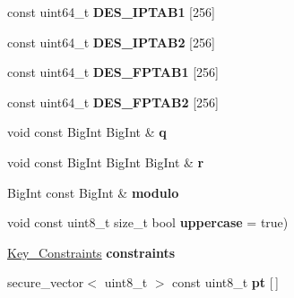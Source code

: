 \begin{DoxyCompactItemize}
\item 
\mbox{\label{namespace_botan_ad7e89955b908b23a9f94ba933c449349}} 
const uint64\+\_\+t {\bfseries D\+E\+S\+\_\+\+I\+P\+T\+A\+B1} \mbox{[}256\mbox{]}
\item 
\mbox{\label{namespace_botan_a81eb07a1d69c9086ecbb45da467022d5}} 
const uint64\+\_\+t {\bfseries D\+E\+S\+\_\+\+I\+P\+T\+A\+B2} \mbox{[}256\mbox{]}
\item 
\mbox{\label{namespace_botan_aa5c5bba8c5275bebff0ff78771712a6d}} 
const uint64\+\_\+t {\bfseries D\+E\+S\+\_\+\+F\+P\+T\+A\+B1} \mbox{[}256\mbox{]}
\item 
\mbox{\label{namespace_botan_ad1e53869fb08b0b36a6ce75fc84cafff}} 
const uint64\+\_\+t {\bfseries D\+E\+S\+\_\+\+F\+P\+T\+A\+B2} \mbox{[}256\mbox{]}
\item 
\mbox{\label{namespace_botan_affe4f8a154009de5159500f03f51432c}} 
void const Big\+Int Big\+Int \& {\bfseries q}
\item 
\mbox{\label{namespace_botan_a9ddeb484029696af800c95d07e76eac4}} 
void const Big\+Int Big\+Int Big\+Int \& {\bfseries r}
\item 
\mbox{\label{namespace_botan_a3ca67d3e67f9e197824bd761c4748d17}} 
Big\+Int const Big\+Int \& {\bfseries modulo}
\item 
\mbox{\label{namespace_botan_a42a3f342c74ac8f571459d0ca7056806}} 
void const uint8\+\_\+t size\+\_\+t bool {\bfseries uppercase} = true)
\item 
\mbox{\label{namespace_botan_a705f886fe973cef51f3867fddbeb05e7}} 
\hyperlink{namespace_botan_aed0885e5c70627dd43827b966e727654}{Key\+\_\+\+Constraints} {\bfseries constraints}
\item 
\mbox{\label{namespace_botan_a40670bb3ebcc56c095d864d93cc7a256}} 
secure\+\_\+vector$<$ uint8\+\_\+t $>$ const uint8\+\_\+t {\bfseries pt} \mbox{[}$\,$\mbox{]}
\item 
\mbox{\label{namespace_botan_a7818000c1be4c2d881272301a60dad50}} 

\end{DoxyCompactItemize}
